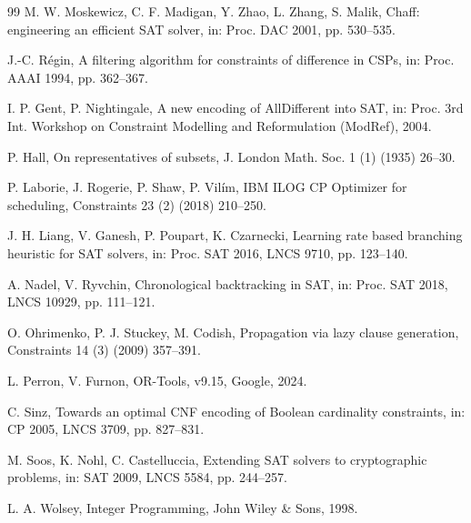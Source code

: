 \documentclass[a4paper,fleqn]{cas-sc}
\begin{document}
\begin{thebibliography}{99}
 M. W. Moskewicz, C. F. Madigan, Y. Zhao, L. Zhang, S. Malik, Chaff: engineering an efficient SAT solver, in: Proc. DAC 2001, pp. 530--535.

 J.-C. R\'egin, A filtering algorithm for constraints of difference in CSPs, in: Proc. AAAI 1994, pp. 362--367.

 I. P. Gent, P. Nightingale, A new encoding of AllDifferent into SAT, in: Proc. 3rd Int. Workshop on Constraint Modelling and Reformulation (ModRef), 2004.

 P. Hall, On representatives of subsets, J. London Math. Soc. 1 (1) (1935) 26--30.

 P. Laborie, J. Rogerie, P. Shaw, P. Vil\'im, IBM ILOG CP Optimizer for scheduling, Constraints 23 (2) (2018) 210--250.

 J. H. Liang, V. Ganesh, P. Poupart, K. Czarnecki, Learning rate based branching heuristic for SAT solvers, in: Proc. SAT 2016, LNCS 9710, pp. 123--140.

 A. Nadel, V. Ryvchin, Chronological backtracking in SAT, in: Proc. SAT 2018, LNCS 10929, pp. 111--121.

 O. Ohrimenko, P. J. Stuckey, M. Codish, Propagation via lazy clause generation, Constraints 14 (3) (2009) 357--391.

 L. Perron, V. Furnon, OR-Tools, v9.15, Google, 2024.

 C. Sinz, Towards an optimal CNF encoding of Boolean cardinality constraints, in: CP 2005, LNCS 3709, pp. 827--831.

 M. Soos, K. Nohl, C. Castelluccia, Extending SAT solvers to cryptographic problems, in: SAT 2009, LNCS 5584, pp. 244--257.

 L. A. Wolsey, Integer Programming, John Wiley \& Sons, 1998.

\end{thebibliography}
\end{document}
